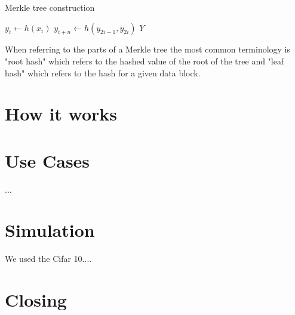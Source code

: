 \documentclass[12pt]{article}
\begin{document}
 \begin{algorithm}[H]
 	\caption{Merkle tree construction}
 	\begin{algorithmic}
 		 
 		\State $y_i \leftarrow h(x_i)$  
 		\EndFor
 		   
 		\State $y_{i+n} \leftarrow h(y_{2i-1}, y_{2i}) $ 
 		\EndFor
 		\State \Return $Y$ 
 	\end{algorithmic}
 \end{algorithm}
 
When referring to the parts of a Merkle tree the most common terminology is "root hash" which refers to the hashed value of the root of the tree and "leaf hash" which refers to the hash for a given data block. 



\section{How it works}



\section{Use Cases}

...


\section{Simulation}

We used the Cifar 10....

\section{Closing}





\newpage

\printbibliography
\end{document}
